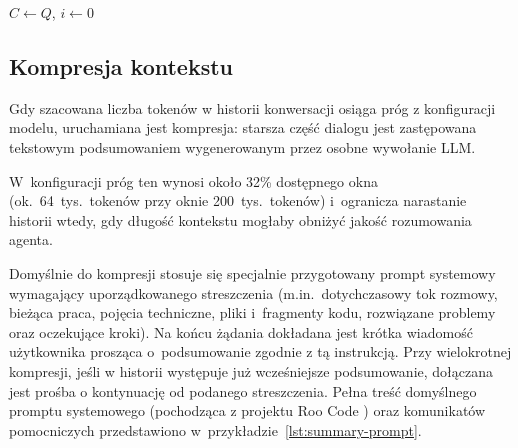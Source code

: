 \begin{algorithm}[H]
    \scriptsize
    \SetAlgoLined
    \DontPrintSemicolon
    $C \leftarrow Q$, $i \leftarrow 0$\;
    \caption{\scriptsize Agent Re-Act z kompresją kontekstu i limitem iteracji}
\end{algorithm}

\subsection{Kompresja kontekstu}
Gdy szacowana liczba tokenów w historii konwersacji osiąga próg z konfiguracji modelu, uruchamiana jest kompresja: starsza część dialogu jest zastępowana tekstowym podsumowaniem wygenerowanym przez osobne wywołanie LLM. 

W~konfiguracji próg ten wynosi około 32\% dostępnego okna (ok.\ 64~tys.\ tokenów przy oknie 200~tys.\ tokenów) i~ogranicza narastanie historii wtedy, gdy długość kontekstu mogłaby obniżyć jakość rozumowania agenta.

Domyślnie do kompresji stosuje się specjalnie przygotowany prompt systemowy wymagający uporządkowanego streszczenia (m.in.\ dotychczasowy tok rozmowy, bieżąca praca, pojęcia techniczne, pliki i~fragmenty kodu, rozwiązane problemy oraz oczekujące kroki). Na końcu żądania dokładana jest krótka wiadomość użytkownika prosząca o~podsumowanie zgodnie z tą instrukcją. Przy wielokrotnej kompresji, jeśli w historii występuje już wcześniejsze podsumowanie, dołączana jest prośba o kontynuację od podanego streszczenia.
\newpage
Pełna treść domyślnego promptu systemowego (pochodząca z projektu Roo Code \cite{roocode_github}) oraz komunikatów pomocniczych przedstawiono w~przykładzie~\ref{lst:summary-prompt}.

